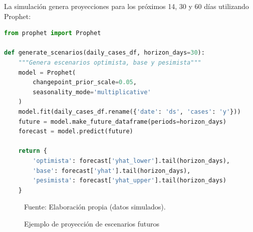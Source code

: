 \documentclass[12pt,a4paper]{article}
\renewcommand{\footnotesize}{\fontsize{10pt}{12pt}\selectfont}
\begin{document}
La simulación genera proyecciones para los próximos 14, 30 y 60 días utilizando Prophet:

\begin{lstlisting}[language=Python, caption=Simulación de escenarios con Prophet]
from prophet import Prophet

def generate_scenarios(daily_cases_df, horizon_days=30):
    """Genera escenarios optimista, base y pesimista"""
    model = Prophet(
        changepoint_prior_scale=0.05,
        seasonality_mode='multiplicative'
    )
    model.fit(daily_cases_df.rename({'date': 'ds', 'cases': 'y'}))
    future = model.make_future_dataframe(periods=horizon_days)
    forecast = model.predict(future)

    return {
        'optimista': forecast['yhat_lower'].tail(horizon_days),
        'base': forecast['yhat'].tail(horizon_days),
        'pesimista': forecast['yhat_upper'].tail(horizon_days)
    }
\end{lstlisting}

\begin{figure}[H]
    \centering
    \caption{Ejemplo de proyección de escenarios futuros}
    {\footnotesize Fuente: Elaboración propia (datos simulados).}
\end{figure}
\end{document}

